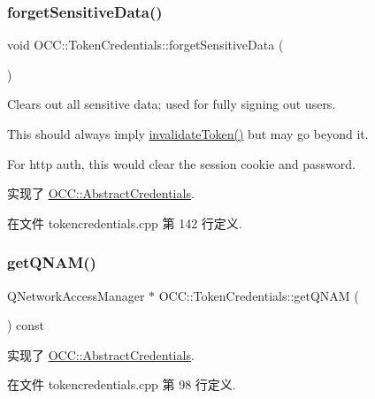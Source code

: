 \subsubsection{\texorpdfstring{forget\+Sensitive\+Data()}{forgetSensitiveData()}}
{\footnotesize\ttfamily void O\+C\+C\+::\+Token\+Credentials\+::forget\+Sensitive\+Data (\begin{DoxyParamCaption}{ }\end{DoxyParamCaption})\hspace{0.3cm}{\ttfamily [virtual]}}

Clears out all sensitive data; used for fully signing out users.

This should always imply \hyperlink{class_o_c_c_1_1_token_credentials_a8d2456b0fb01c7b69dece6a762dd16b5}{invalidate\+Token()} but may go beyond it.

For http auth, this would clear the session cookie and password. 

实现了 \hyperlink{class_o_c_c_1_1_abstract_credentials_af8f5afe21813bd54607713342fef8448}{O\+C\+C\+::\+Abstract\+Credentials}.



在文件 tokencredentials.\+cpp 第 142 行定义.

\mbox{\label{class_o_c_c_1_1_token_credentials_af5d6eb118b0d49adb6f6a2d572d157e6}} 
\subsubsection{\texorpdfstring{get\+Q\+N\+A\+M()}{getQNAM()}}
{\footnotesize\ttfamily Q\+Network\+Access\+Manager $\ast$ O\+C\+C\+::\+Token\+Credentials\+::get\+Q\+N\+AM (\begin{DoxyParamCaption}{ }\end{DoxyParamCaption}) const\hspace{0.3cm}{\ttfamily [virtual]}}



实现了 \hyperlink{class_o_c_c_1_1_abstract_credentials_ae5b9fd23e37129efede9b4d430ac5766}{O\+C\+C\+::\+Abstract\+Credentials}.



在文件 tokencredentials.\+cpp 第 98 行定义.

\mbox{\label{class_o_c_c_1_1_token_credentials_a8d2456b0fb01c7b69dece6a762dd16b5}} 

